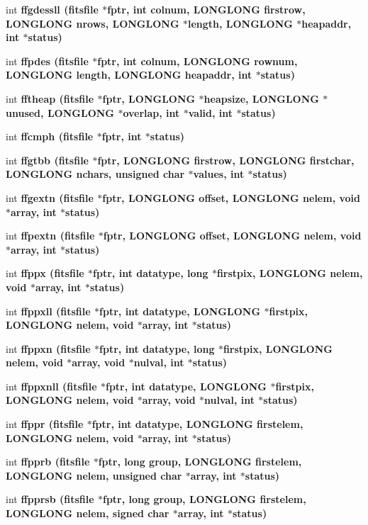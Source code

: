 \begin{CompactItemize}
int \bf{ffgdessll} (\bf{fitsfile} $\ast$fptr, int colnum, \bf{LONGLONG} firstrow, \bf{LONGLONG} nrows, \bf{LONGLONG} $\ast$length, \bf{LONGLONG} $\ast$heapaddr, int $\ast$status)
\item 
int \bf{ffpdes} (\bf{fitsfile} $\ast$fptr, int colnum, \bf{LONGLONG} rownum, \bf{LONGLONG} length, \bf{LONGLONG} heapaddr, int $\ast$status)
\item 
int \bf{fftheap} (\bf{fitsfile} $\ast$fptr, \bf{LONGLONG} $\ast$heapsize, \bf{LONGLONG} $\ast$unused, \bf{LONGLONG} $\ast$overlap, int $\ast$valid, int $\ast$status)
\item 
int \bf{ffcmph} (\bf{fitsfile} $\ast$fptr, int $\ast$status)
\item 
int \bf{ffgtbb} (\bf{fitsfile} $\ast$fptr, \bf{LONGLONG} firstrow, \bf{LONGLONG} firstchar, \bf{LONGLONG} nchars, unsigned char $\ast$values, int $\ast$status)
\item 
int \bf{ffgextn} (\bf{fitsfile} $\ast$fptr, \bf{LONGLONG} offset, \bf{LONGLONG} nelem, void $\ast$array, int $\ast$status)
\item 
int \bf{ffpextn} (\bf{fitsfile} $\ast$fptr, \bf{LONGLONG} offset, \bf{LONGLONG} nelem, void $\ast$array, int $\ast$status)
\item 
int \bf{ffppx} (\bf{fitsfile} $\ast$fptr, int \bf{datatype}, long $\ast$firstpix, \bf{LONGLONG} nelem, void $\ast$array, int $\ast$status)
\item 
int \bf{ffppxll} (\bf{fitsfile} $\ast$fptr, int \bf{datatype}, \bf{LONGLONG} $\ast$firstpix, \bf{LONGLONG} nelem, void $\ast$array, int $\ast$status)
\item 
int \bf{ffppxn} (\bf{fitsfile} $\ast$fptr, int \bf{datatype}, long $\ast$firstpix, \bf{LONGLONG} nelem, void $\ast$array, void $\ast$nulval, int $\ast$status)
\item 
int \bf{ffppxnll} (\bf{fitsfile} $\ast$fptr, int \bf{datatype}, \bf{LONGLONG} $\ast$firstpix, \bf{LONGLONG} nelem, void $\ast$array, void $\ast$nulval, int $\ast$status)
\item 
int \bf{ffppr} (\bf{fitsfile} $\ast$fptr, int \bf{datatype}, \bf{LONGLONG} firstelem, \bf{LONGLONG} nelem, void $\ast$array, int $\ast$status)
\item 
int \bf{ffpprb} (\bf{fitsfile} $\ast$fptr, long group, \bf{LONGLONG} firstelem, \bf{LONGLONG} nelem, unsigned char $\ast$array, int $\ast$status)
\item 
int \bf{ffpprsb} (\bf{fitsfile} $\ast$fptr, long group, \bf{LONGLONG} firstelem, \bf{LONGLONG} nelem, signed char $\ast$array, int $\ast$status)

\end{CompactItemize}
